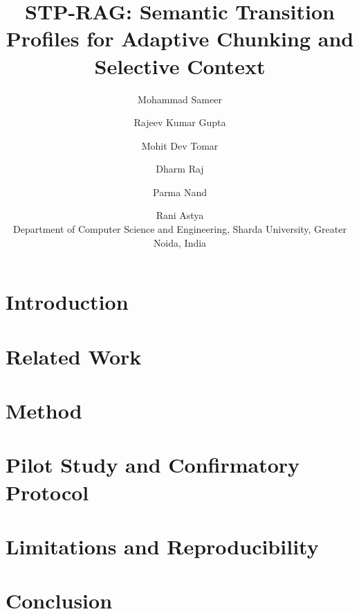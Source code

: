 \documentclass[10pt]{article}
\title{STP-RAG: Semantic Transition Profiles for Adaptive Chunking and Selective Context}
\author{Mohammad Sameer \and Rajeev Kumar Gupta \and Mohit Dev Tomar \and Dharm Raj \and Parma Nand \and Rani Astya \\ Department of Computer Science and Engineering, Sharda University, Greater Noida, India}
\date{}
\begin{document}
\maketitle
\begin{abstract}
\end{abstract}
\section{Introduction}
\section{Related Work}
\section{Method}
\section{Pilot Study and Confirmatory Protocol}
\section{Limitations and Reproducibility}
\section{Conclusion}


\end{document}
